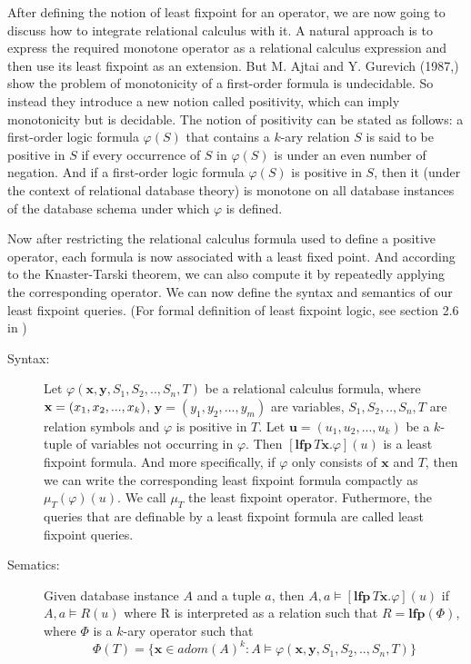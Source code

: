 After defining the notion of least fixpoint for an operator, we are now going to discuss how to integrate relational calculus with it. A natural approach is to express the required monotone operator as a relational calculus expression and then use its least fixpoint as an extension. But M. Ajtai and Y. Gurevich (1987,\cite{Ajtai}) show the problem of monotonicity of a first-order formula is undecidable. So instead they introduce a new notion called positivity, which can imply monotonicity but is decidable. The notion of positivity can be stated as follows: a first-order logic formula $\varphi(S)$ that contains a $k$-ary relation $S$ is said to be positive in $S$ if every occurrence of $S$ in $\varphi(S)$ is under an even number of negation. And if a first-order logic formula $\varphi(S)$ is positive in $S$, then it (under the context of relational database theory) is monotone on all database instances of the database schema under which $\varphi$ is defined.

Now after restricting the relational calculus formula used to define a positive operator, each formula is now associated with a least fixed point. And according to the Knaster-Tarski theorem, we can also compute it by repeatedly applying the corresponding operator. We can now define the syntax and semantics of our least fixpoint queries. (For formal definition of least fixpoint logic, see section 2.6 in \cite{kolaitis1})

\begin{description}

\item[Syntax:]
Let $\varphi(\textbf{x},\textbf{y}, S_1,S_2,..,S_n, T)$ be a relational calculus formula, where $\textbf{x}=(x_1, \\x_2,...,x_k)$, $\textbf{y}=(y_1,y_2,...,y_m)$ are variables, $S_1,S_2,..,S_n, T$ are relation symbols and $\varphi$ is positive in $T$. Let $\textbf{u}=(u_1, u_2,...,u_k)$ be a $k$-tuple of variables not occurring in $\varphi$. Then $[\textbf{lfp}\,T\textbf{x}.\varphi](u)$ is a least fixpoint formula. And more specifically, if $\varphi$ only consists of $\textbf{x}$ and $T$, then we can write the corresponding least fixpoint formula compactly as $\mu_T(\varphi)(u)$. We call $\mu_T$ the least fixpoint operator. Futhermore, the queries that are definable by a least fixpoint formula are called least fixpoint queries.

\item[Sematics:]
Given database instance $A$ and a tuple $a$, then $A, a \models [\textbf{lfp}\,T\textbf{x}.\varphi](u)$ if $A, a \models R(u)$ where R is interpreted as a relation such that $R=\textbf{lfp}(\Phi)$, where $\Phi$ is a $k$-ary operator such that
$$ \Phi(T) = \{\textbf{x}\in adom(A)^k: A\models \varphi(\textbf{x},\textbf{y},S_1,S_2,..,S_n,T)\}$$ 

\end{description}

